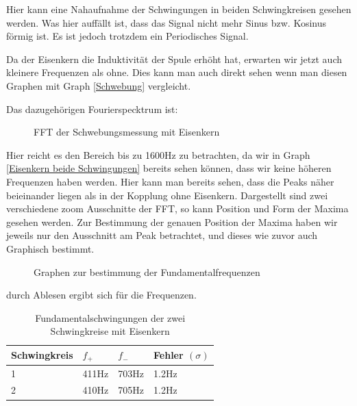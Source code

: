 \documentclass[twoside]{protokoll}
\begin{document}
Hier kann eine Nahaufnahme der Schwingungen in beiden Schwingkreisen gesehen werden. Was hier auffällt ist, dass das Signal nicht mehr Sinus bzw. Kosinus förmig ist. Es ist jedoch trotzdem ein Periodisches Signal.

Da der Eisenkern die Induktivität der Spule erhöht hat, erwarten wir jetzt auch kleinere Frequenzen als ohne. Dies kann man auch direkt sehen wenn man diesen Graphen mit Graph \ref{Schwebung} vergleicht. 

Das dazugehörigen Fourierspecktrum ist:

\begin{figure}[H]
    \centering
    \hfill
    \caption{FFT der Schwebungsmessung mit Eisenkern }
\end{figure}

Hier reicht es den Bereich bis zu 1600Hz zu betrachten, da wir in Graph \ref{Eisenkern beide Schwingungen} bereits sehen können, dass wir keine höheren Frequenzen haben werden. Hier kann man bereits sehen, dass die Peaks näher beieinander liegen als in der Kopplung ohne Eisenkern.
Dargestellt sind zwei verschiedene zoom Ausschnitte der FFT, so kann Position und Form der Maxima gesehen werden.
 Zur Bestimmung der genauen Position der Maxima haben wir jeweils nur den Ausschnitt am Peak betrachtet, und dieses wie zuvor auch Graphisch bestimmt.

\begin{figure}[H]
    \centering
    \hfill
    \caption{Graphen zur bestimmung der Fundamentalfrequenzen}
\end{figure}

durch Ablesen ergibt sich für die Frequenzen.

\begin{table}[H]
    \centering
    \begin{tabularx}{1\textwidth}{X X X X} %
        \toprule
        \textbf{Schwingkreis} & \textbf{$f_+$ } & \textbf{$f_-$ } & \textbf{Fehler $(\sigma)$}\\
        \midrule
        1 & 411Hz & 703Hz & 1.2Hz\\
        2 & 410Hz & 705Hz & 1.2Hz\\
        \bottomrule
    \end{tabularx}
    \caption{Fundamentalschwingungen der zwei Schwingkreise mit Eisenkern}
    \label{•}
\end{table}
\end{document}
